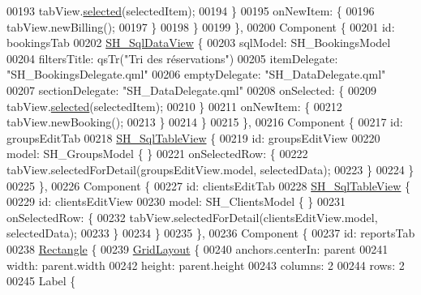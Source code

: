 \begin{DoxyCode}
00193                     tabView.\hyperlink{classSH__SqlDataView_a95366e3f65b183e8c82381e90b5ddc94}{selected}(selectedItem);
00194                 \}
00195                 onNewItem: \{
00196                     tabView.newBilling();
00197                 \}
00198             \}
00199         \},
00200         Component \{
00201             \textcolor{keywordtype}{id}: bookingsTab
00202             \hyperlink{classSH__SqlDataView}{SH\_SqlDataView} \{
00203                 sqlModel: SH\_BookingsModel
00204                 filtersTitle: qsTr(\textcolor{stringliteral}{"Tri des réservations"})
00205                 itemDelegate: \textcolor{stringliteral}{"SH\_BookingsDelegate.qml"}
00206                 emptyDelegate: \textcolor{stringliteral}{"SH\_DataDelegate.qml"}
00207                 sectionDelegate: \textcolor{stringliteral}{"SH\_DataDelegate.qml"}
00208                 onSelected: \{
00209                     tabView.\hyperlink{classSH__SqlDataView_a95366e3f65b183e8c82381e90b5ddc94}{selected}(selectedItem);
00210                 \}
00211                 onNewItem: \{
00212                     tabView.newBooking();
00213                 \}
00214             \}
00215         \},
00216         Component \{
00217             \textcolor{keywordtype}{id}: groupsEditTab
00218             \hyperlink{classSH__SqlTableView}{SH\_SqlTableView} \{
00219                 \textcolor{keywordtype}{id}: groupsEditView
00220                 model: SH\_GroupsModel \{ \}
00221                 onSelectedRow: \{
00222                     tabView.selectedForDetail(groupsEditView.model, selectedData);
00223                 \}
00224             \}
00225         \},
00226         Component \{
00227             \textcolor{keywordtype}{id}: clientsEditTab
00228             \hyperlink{classSH__SqlTableView}{SH\_SqlTableView} \{
00229                 \textcolor{keywordtype}{id}: clientsEditView
00230                 model: SH\_ClientsModel \{ \}
00231                 onSelectedRow: \{
00232                     tabView.selectedForDetail(clientsEditView.model, selectedData);
00233                 \}
00234             \}
00235         \},
00236         Component \{
00237             \textcolor{keywordtype}{id}: reportsTab
00238             \hyperlink{classRectangle}{Rectangle} \{
00239                 \hyperlink{classGridLayout}{GridLayout} \{
00240                     anchors.centerIn: parent
00241                     width: parent.width
00242                     height: parent.height
00243                     columns: 2
00244                     rows: 2
00245                     Label \{

\end{DoxyCode}
